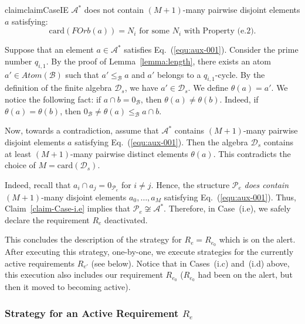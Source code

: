 \documentclass[a4paper,UKenglish,cleveref, autoref, thm-restate]{lipics-v2021}
\begin{document}
\begin{restatable}{claim}{claimCaseIE}\label{claim-Case-i.e}
$\mathcal{A}^{\ast}$ does not contain $(M+1)$-many pairwise disjoint elements $a$ satisfying:
\begin{equation}\label{equ:aux-001}
	\mathrm{card}(FOrb(a)) = N_i \text{ for some } N_i \text{ with Property~(e.2).} 
\end{equation}
\end{restatable}

\begin{claimproof}
Suppose that an element $a\in \mathcal{A}^{\ast}$ satisfies Eq.~(\ref{equ:aux-001}).
Consider the prime number $q_{i,1}$. By the proof of Lemma~\ref{lemma:length}, there exists an atom $a' \in Atom(\mathcal{B})$ such that $a' \leq_{\mathcal{B}} a$ and $a'$ belongs to a $q_{i,1}$-cycle. By the definition of the finite algebra $\mathcal{D}_s$, we have $a' \in \mathcal{D}_s$. We define $\theta(a) = a'$.
We notice the following fact: if $a\cap b = 0_{\mathcal{B}}$, then $\theta(a) \neq \theta(b)$. Indeed, if $\theta(a) = \theta(b)$, then $0_{\mathcal{B}} \neq \theta(a) \leq_{\mathcal{B}} a\cap b$.

Now, towards a contradiction, assume that $\mathcal{A}^{\ast}$ contains $(M+1)$-many pairwise disjoint elements $a$ satisfying Eq.~(\ref{equ:aux-001}). Then the algebra $\mathcal{D}_s$ contains at least $(M+1)$-many pairwise distinct elements $\theta(a)$. This contradicts the choice of $M  = \mathrm{card}(\mathcal{D}_s)$.
\end{claimproof}

Indeed, recall that $a_i\cap a_j = 0_{\mathcal{P}_e}$ for $i\neq j$. Hence, the structure $\mathcal{P}_e$ \emph{does contain} $(M+1)$-many disjoint elements $a_0,\dots,a_{M}$ satisfying Eq.~(\ref{equ:aux-001}). Thus, Claim~\ref{claim-Case-i.e} implies that $\mathcal{P}_e \not\cong \mathcal{A}^{\ast}$. 
Therefore, in Case~(i.e), we safely declare the requirement $R_e$ deactivated. 



This concludes the description of the strategy for $R_e = R_{e_0}$ which is on the alert. 
After executing this strategy, one-by-one, we execute strategies for the currently active requirements $R_{e'}$ (see below). Notice that in Cases~(i.c) and~(i.d) above, this execution also includes our requirement $R_{e_0}$ ($R_{e_0}$ had been on the alert, but then it moved to becoming active).


\subsubsection{Strategy for an Active Requirement $R_e$}
\end{document}
